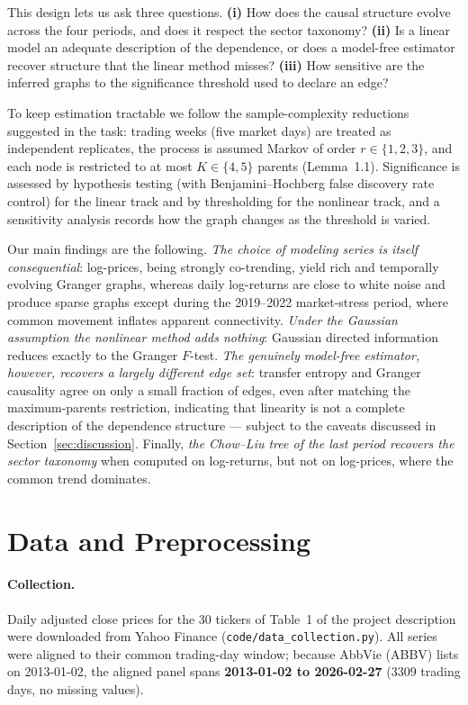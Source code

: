 \documentclass[11pt,a4paper]{article}
\begin{document}
This design lets us ask three questions. \textbf{(i)} How does the causal
structure evolve across the four periods, and does it respect the sector
taxonomy? \textbf{(ii)} Is a linear model an adequate description of the
dependence, or does a model-free estimator recover structure that the linear
method misses? \textbf{(iii)} How sensitive are the inferred graphs to the
significance threshold used to declare an edge?

To keep estimation tractable we follow the sample-complexity reductions
suggested in the task: trading weeks (five market days) are treated as
independent replicates, the process is assumed Markov of order $r\in\{1,2,3\}$,
and each node is restricted to at most $K\in\{4,5\}$ parents (Lemma~1.1).
Significance is assessed by hypothesis testing (with Benjamini--Hochberg false
discovery rate control) for the linear track and by thresholding for the
nonlinear track, and a sensitivity analysis records how the graph changes as the
threshold is varied.

Our main findings are the following. \emph{The choice of modeling series is
itself consequential}: log-prices, being strongly co-trending, yield rich and
temporally evolving Granger graphs, whereas daily log-returns are close to white
noise and produce sparse graphs except during the 2019--2022 market-stress
period, where common movement inflates apparent connectivity. \emph{Under the
Gaussian assumption the nonlinear method adds nothing}: Gaussian directed
information reduces exactly to the Granger $F$-test. \emph{The genuinely
model-free estimator, however, recovers a largely different edge set}: transfer
entropy and Granger causality agree on only a small fraction of edges, even after
matching the maximum-parents restriction, indicating that linearity is not a
complete description of the dependence structure --- subject to the caveats
discussed in Section~\ref{sec:discussion}. Finally, \emph{the Chow--Liu tree of
the last period recovers the sector taxonomy} when computed on log-returns, but
not on log-prices, where the common trend dominates.

\section{Data and Preprocessing}
\paragraph{Collection.}
Daily adjusted close prices for the 30 tickers of Table~1 of the project
description were downloaded from Yahoo Finance
(\texttt{code/data\_collection.py}). All series were aligned to their common
trading-day window; because AbbVie (ABBV) lists on 2013-01-02, the aligned panel
spans \textbf{2013-01-02 to 2026-02-27} ($3309$ trading days, no missing values).
\end{document}
